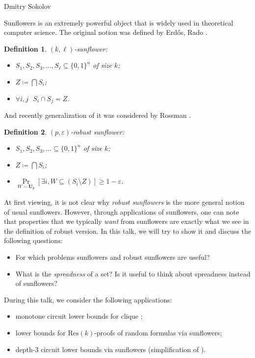 \documentclass[report]{owrart}
\newtheorem{definition}{Definition}
\begin{document}
\begin{report}
\begin{talk}{Dmitry Sokolov}
\noindent 

Sunflowers is an extremely powerful object that is widely used in theoretical computer science.
The original notion was defined by Erd\H{o}s, Rado \cite{ER60}.
\begin{definition}
    $(k, \ell)$-sunflower:
    \begin{itemize}
        \item $S_1, S_2, S_3, \dots, S_{\ell} \subseteq \{0, 1\}^n$ of size $k$;
        \item $Z \coloneqq \bigcap S_i$;
        \item $\forall i, j ~~~ S_i \cap S_j = Z$.
    \end{itemize}
\end{definition}
And recently generalization of it was considered by Rossman \cite{Ross14}.
\begin{definition}
    $(p, \varepsilon)$-robust sunflower:
        \begin{itemize}
            \item $S_1, S_2, S_3, \dots \subseteq \{0, 1\}^n$ of size $k$;
            \item $Z \coloneqq \bigcap S_i$;
            \item $\Pr\limits_{W \sim \mathbf{U}_p}[\exists i, W \subseteq (S_i \setminus Z)] \ge 1 -
                \varepsilon$.
        \end{itemize}
\end{definition}

At first viewing, it is not clear why \emph{robust sunflowers} is the more general notion of usual
sunflowers. However, through applications of sunflowers, one can note that properties that we typically
\emph{want} from sunflowers are exactly what we see in the definition of robust version. In this talk, we
will try to show it and discuss the following questions:
\begin{itemize}
    \item For which problems sunflowers and robust sunflowers are useful?
    \item What is the \emph{spreadness} of a set? Is it useful to think about spreadness instead of
        sunflowers?
\end{itemize}

During this talk, we consider the following applications:
\begin{itemize}
    \item monotone circuit lower bounds for clique \cite{Razb85, AB87};
    \item lower bounds for $\mathrm{Res}(k)$-proofs of random formulas via sunflowers;
    \item depth-$3$ circuit lower bounds via sunflowers (simplification of \cite{GRSS23}).
\end{itemize}


\end{talk}
\end{report}
\end{document}
